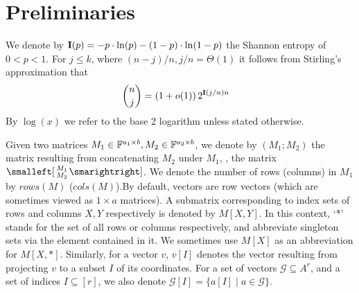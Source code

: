 
\chapter{Preliminaries}
\label{sec:prelim}


We denote by $\mathbf{I}({p})=-p\cdot \ln(p)-(1-p)\cdot \ln(1-p)$ the Shannon entropy of $0<p<1$.
For $j\leq k$, where $(n-j)/n, j/n=\Theta(1)$ it follows from Stirling's approximation that
\begin{align}
&\binom{n}{j}=\left(1+o(1)\right)2^{\mathbf{I}({j/n})n}\label{eq:bin}
\end{align}
By $\log(x)$ we refer to the base 2 logarithm unless stated otherwise. 

Given two matrices $M_1\in\mathbb{F}^{a_1\times b}, M_2\in\mathbb{F}^{a_2\times b}$, we denote by $(M_1;M_2)$
the matrix resulting from concatenating $M_2$ under $M_1$, \ie, the matrix $\smalleft[\begin{smallmatrix}M_1\\M_2\end{smallmatrix}\smarightright]$.
We denote the number of rows (columns) in $M_1$ by $rows(M)$ ($cols(M)$).By default, vectors are row vectors (which are sometimes viewed as $1\times a$ matrices). A submatrix corresponding to index sets of rows and columns $X,Y$ respectively is denoted by $M[X,Y]$. In this context, `*' stands for the set of all rows or columns respectively, and abbreviate singleton sets via the element contained in it. We sometimes use $M[X]$ as an abbreviation for $M[X,*]$. Similarly, for a vector $v$, $v[I]$ denotes the vector resulting from projecting $v$ to a subset $I$ of its coordinates. For a set of vectors $\mathcal{G}\subseteq A^r$, and a set of indices $I\subseteq [r]$, we also denote $\mathcal{G}[I]=\{a[I] \;|\; a\in \mathcal{G}\}$.  

